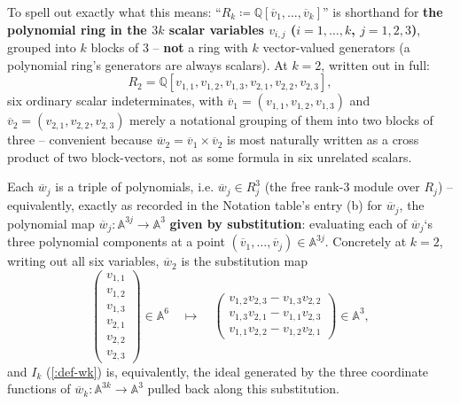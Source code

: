 \documentclass[a4paper,11pt]{scrartcl}
\begin{document}
To spell out exactly what this means: ``\(R_{k} ≔ \mathbb{Q}\left\lbrack {\overline{v}}_{1},\ldots,{\overline{v}}_{k} \right\rbrack\)'' is shorthand for \textbf{the polynomial ring in the \(3k\) scalar variables \(v_{i,j}\) (\(i = 1,\ldots,k\), \(j = 1,2,3\))}, grouped into \(k\) blocks of 3 -- \textbf{not} a ring with \(k\) vector-valued generators (a polynomial ring's generators are always scalars). At \(k = 2\), written out in full: \[R_{2} = \mathbb{Q}\left\lbrack v_{1,1},v_{1,2},v_{1,3},v_{2,1},v_{2,2},v_{2,3} \right\rbrack,\] six ordinary scalar indeterminates, with \({\overline{v}}_{1} = \left( v_{1,1},v_{1,2},v_{1,3} \right)\) and \({\overline{v}}_{2} = \left( v_{2,1},v_{2,2},v_{2,3} \right)\) merely a notational grouping of them into two blocks of three -- convenient because \({\overline{w}}_{2} = {\overline{v}}_{1} \times {\overline{v}}_{2}\) is most naturally written as a cross product of two block-vectors, not as some formula in six unrelated scalars.

Each \({\overline{w}}_{j}\) is a triple of polynomials, i.e. \({\overline{w}}_{j} \in R_{j}^{3}\) (the free rank-3 module over \(R_{j}\)) -- equivalently, exactly as recorded in the Notation table's entry (b) for \({\overline{w}}_{j}\), the polynomial map \({\overline{w}}_{j}:\mathbb{A}^{3j} \rightarrow \mathbb{A}^{3}\) \textbf{given by substitution}: evaluating each of \({\overline{w}}_{j}\)`s three polynomial components at a point \(\left( {\overline{v}}_{1},\ldots,{\overline{v}}_{j} \right) \in \mathbb{A}^{3j}\). Concretely at \(k = 2\), writing out all six variables, \({\overline{w}}_{2}\) is the substitution map \[\begin{pmatrix}
v_{1,1} \\
v_{1,2} \\
v_{1,3} \\
v_{2,1} \\
v_{2,2} \\
v_{2,3}
\end{pmatrix} \in \mathbb{A}^{6}\quad \mapsto \quad\begin{pmatrix}
v_{1,2}v_{2,3} - v_{1,3}v_{2,2} \\
v_{1,3}v_{2,1} - v_{1,1}v_{2,3} \\
v_{1,1}v_{2,2} - v_{1,2}v_{2,1}
\end{pmatrix} \in \mathbb{A}^{3},\] and \(I_{k}\) (\cref{:def-wk}) is, equivalently, the ideal generated by the three coordinate functions of \({\overline{w}}_{k}:\mathbb{A}^{3k} \rightarrow \mathbb{A}^{3}\) pulled back along this substitution.
\end{document}
